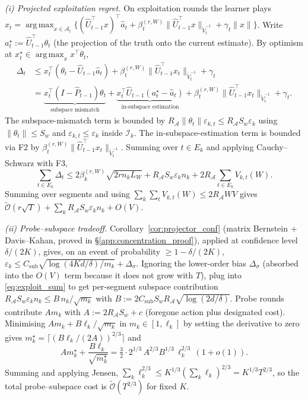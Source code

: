 \documentclass{article}
\newcommand{\cA}{\mathcal{A}}
\newcommand{\cI}{\mathcal{I}}
\newcommand{\tilO}{\widetilde{\mathcal{O}}}
\DeclareMathOperator*{\argmax}{arg\,max}
\begin{document}
\emph{(i) Projected exploitation regret.}
On exploitation rounds the learner plays
$x_t = \argmax_{x\in\cA_t}\{(\widehat U_{t-1}^\top x)^\top \widehat a_t
+ \beta_t^{(r,W)}\|\widehat U_{t-1}^\top x\|_{\widetilde V_t^{-1}}
+ \gamma_t\|x\|\}$. Write $a_t^\star := \widehat U_{t-1}^\top \theta_t$
(the projection of the truth onto the current estimate). By optimism
at $x_t^\star\in\argmax_x x^\top\theta_t$,
\begin{align*}
\Delta_t &\le x_t^\top(\theta_t - \widehat U_{t-1}\widehat a_t)
 + \beta_t^{(r,W)}\|\widehat U_{t-1}^\top x_t\|_{\widetilde V_t^{-1}}
 + \gamma_t\\
&= \underbrace{x_t^\top(I-\widehat P_{t-1})\theta_t}_{\text{subspace mismatch}}
 + \underbrace{x_t^\top \widehat U_{t-1}(a_t^\star - \widehat a_t)}_{\text{in-subspace estimation}}
 + \beta_t^{(r,W)}\|\widehat U_{t-1}^\top x_t\|_{\widetilde V_t^{-1}}
 + \gamma_t.
\end{align*}
The subspace-mismatch term is bounded by
$R_\cA \|\theta_t\| \varepsilon_{k,t} \le R_\cA S_w \varepsilon_k$
using $\|\theta_t\|\le S_w$ and $\varepsilon_{k,t}\le\varepsilon_k$ inside
$\cI_k$. The in-subspace-estimation term is bounded via F2 by
$\beta_t^{(r,W)}\|\widehat U_{t-1}^\top x_t\|_{\widetilde V_t^{-1}}$.
Summing over $t\in E_k$ and applying Cauchy--Schwarz with F3,
\begin{equation}
\sum_{t\in E_k}\Delta_t
\le 2\beta_k^{(r,W)}\sqrt{2 r n_k L_W}
+ R_\cA S_w \varepsilon_k n_k
+ 2 R_\cA\sum_{t\in E_k} V_{k,t}(W).
\label{eq:exploit_sum}
\end{equation}
Summing over segments and using
$\sum_k\sum_t V_{k,t}(W)\le 2 R_\cA W V$ gives
$\tilO(r\sqrt{T}) + \sum_k R_\cA S_w \varepsilon_k n_k + O(V)$.

\emph{(ii) Probe--subspace tradeoff.}
Corollary~\ref{cor:projector_conf} (matrix Bernstein +
Davis--Kahan, proved in \S\ref{app:concentration_proof}), applied
at confidence level $\delta/(2K)$, gives, on an
event of probability $\ge 1-\delta/(2K)$,
$\varepsilon_k\le C_{\mathrm{sub}}\sqrt{\log(4Kd/\delta)/m_k} + \Delta_\sigma$.
Ignoring the lower-order bias $\Delta_\sigma$ (absorbed into the
$O(V)$ term because it does not grow with $T$), plug into
\eqref{eq:exploit_sum} to get per-segment subspace contribution
$R_\cA S_w \varepsilon_k n_k \le B\,n_k/\sqrt{m_k}$ with
$B := 2 C_{\mathrm{sub}} S_w R_\cA\sqrt{\log(2d/\delta)}$.
Probe rounds contribute $A m_k$ with
$A := 2 R_\cA S_w + c$ (foregone action plus designated cost).
Minimising $A m_k + B\ell_k/\sqrt{m_k}$ in $m_k\in[1,\ell_k]$ by
setting the derivative to zero gives
$m_k^\star = \lceil (B\ell_k/(2A))^{2/3}\rceil$ and
\begin{equation}
A m_k^\star + \frac{B\ell_k}{\sqrt{m_k^\star}}
= \tfrac{3}{2}\cdot 2^{1/3}\, A^{2/3} B^{1/3}\, \ell_k^{2/3}\,(1+o(1)).
\label{eq:opt_mk}
\end{equation}
Summing and applying Jensen,
$\sum_k \ell_k^{2/3}\le K^{1/3}(\sum_k\ell_k)^{2/3} = K^{1/3}T^{2/3}$,
so the total probe--subspace cost is $\tilO(T^{2/3})$ for fixed $K$.
\end{document}
